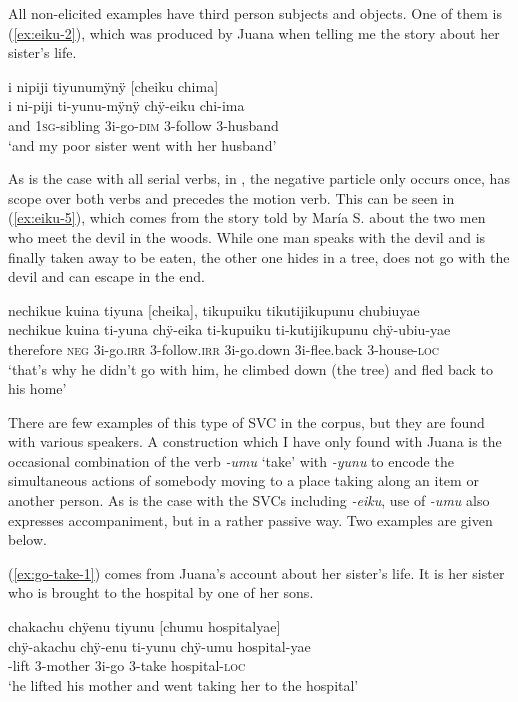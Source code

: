  All non-elicited examples have third person subjects and objects. One of them is (\ref{ex:eiku-2}), which was produced by Juana when telling me the story about her sister’s life. 

\ea\label{ex:eiku-2}
\begingl
\glpreamble i nipiji tiyunumÿnÿ \textup{[}cheiku chima\textup{]}\\
\gla i ni-piji ti-yunu-mÿnÿ chÿ-eiku chi-ima\\
\glb and 1\textsc{sg}-sibling 3i-go-\textsc{dim} 3-follow 3-husband\\
\glft ‘and my poor sister went with her husband’
\endgl
\trailingcitation{[jxx-p120430l-2.063]}
\xe

As is the case with all serial verbs, in , the negative particle only occurs once, has scope over both verbs and precedes the motion verb. This can be seen in (\ref{ex:eiku-5}), which comes from the story told by María S. about the two men who meet the devil in the woods. While one man speaks with the devil and is finally taken away to be eaten, the other one hides in a tree, does not go with the devil and can escape in the end.

\ea\label{ex:eiku-5}
\begingl
\glpreamble nechikue kuina tiyuna \textup{[}cheika\textup{]}, tikupuiku tikutijikupunu chubiuyae\\
\gla nechikue kuina ti-yuna chÿ-eika ti-kupuiku ti-kutijikupunu chÿ-ubiu-yae\\
\glb therefore \textsc{neg} 3i-go.\textsc{irr} 3-follow.\textsc{irr} 3i-go.down 3i-flee.back 3-house-\textsc{loc}\\
\glft ‘that’s why he didn’t go with him, he climbed down (the tree) and fled back to his home’
\endgl
\trailingcitation{[rxx-n120511l-2.67]}
\xe

There are few examples of this type of SVC in the corpus, but they are found with various speakers. A construction which I have only found with Juana is the occasional combination of the verb \textit{-umu} ‘take’ with \textit{-yunu} to encode the simultaneous actions of somebody moving to a place taking along an item or another person. As is the case with the SVCs including \textit{-eiku}, use of \textit{-umu} also expresses accompaniment, but in a rather passive way. Two examples are given below.

(\ref{ex:go-take-1}) comes from Juana’s account about her sister’s life. It is her sister who is brought to the hospital by one of her sons.

\ea\label{ex:go-take-1}
\begingl
\glpreamble chakachu chÿenu tiyunu \textup{[}chumu hospitalyae\textup{]}\\
\gla chÿ-akachu chÿ-enu ti-yunu chÿ-umu hospital-yae\\
-lift 3-mother 3i-go 3-take hospital-\textsc{loc}\\
\glft ‘he lifted his mother and went taking her to the hospital’
\endgl
\trailingcitation{[jxx-p110923l-1.460]}
\xe

